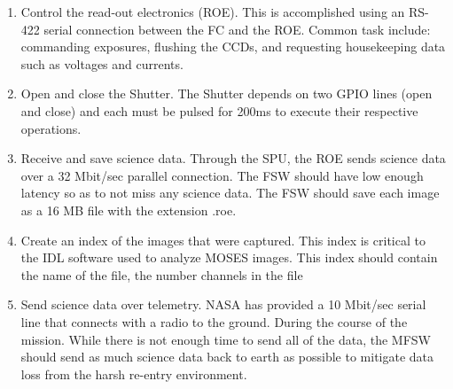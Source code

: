 \begin{enumerate}
  \item Control the read-out electronics (ROE). This is accomplished using an RS-422 serial connection between the FC and the ROE. Common task include: commanding exposures, flushing the CCDs, and requesting housekeeping data such as voltages and currents.
  
  \item Open and close the Shutter. The Shutter depends on two GPIO lines (open and close) and each must be pulsed for 200ms to execute their respective operations.

  \item Receive and save science data. Through the SPU, the ROE sends science data over a 32 Mbit/sec parallel connection. The FSW should have low enough latency so as to not miss any science data. The FSW should save each image as a 16 MB file with the extension .roe.
  
  \item Create an index of the images that were captured. This index is critical to the IDL software used to analyze MOSES images. This index should contain the name of the file, the number channels in the file

  \item Send science data over telemetry. NASA has provided a 10 Mbit/sec serial line that connects with a radio to the ground. During the course of the mission. While there is not enough time to send all of the data, the MFSW should send as much science data back to earth as possible to mitigate data loss from the harsh re-entry environment.


\end{enumerate}
